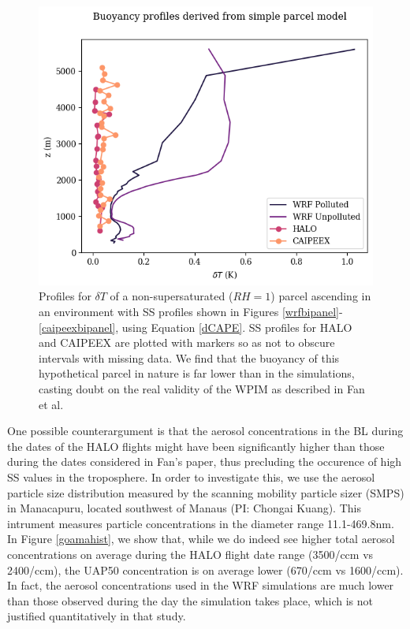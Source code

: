 \documentclass{article}
\begin{document}
\begin{figure}[ht]
    \centering
    \includegraphics[width=12cm]{revmywrf/v2_FINAL_combined_dT_profile_figure.png}
    \caption{Profiles for $\delta T$ of a non-supersaturated ($RH=1$) parcel ascending in an environment with SS profiles shown in Figures \ref{wrfbipanel}-\ref{caipeexbipanel}, using Equation \ref{dCAPE}. SS profiles for HALO and CAIPEEX are plotted with markers so as not to obscure intervals with missing data. We find that the buoyancy of this hypothetical parcel in nature is far lower than in the simulations, casting doubt on the real validity of the WPIM as described in Fan et al.}
    \label{dTprofiles}
\end{figure}

One possible counterargument is that the aerosol concentrations in the BL during the dates of the HALO flights might have been significantly higher than those during the dates considered in Fan's paper, thus precluding the occurence of high SS values in the troposphere. In order to investigate this, we use the aerosol particle size distribution measured by the scanning mobility particle sizer (SMPS) in Manacapuru, located southwest of Manaus (PI: Chongai Kuang). This intrument measures particle concentrations in the diameter range 11.1-469.8nm. In Figure \ref{goamahist}, we show that, while we do indeed see higher total aerosol concentrations on average during the HALO flight date range (3500/ccm vs 2400/ccm), the UAP50 concentration is on average lower (670/ccm vs 1600/ccm). In fact, the aerosol concentrations used in the WRF simulations are much lower than those observed during the day the simulation takes place, which is not justified quantitatively in that study.
\end{document}
